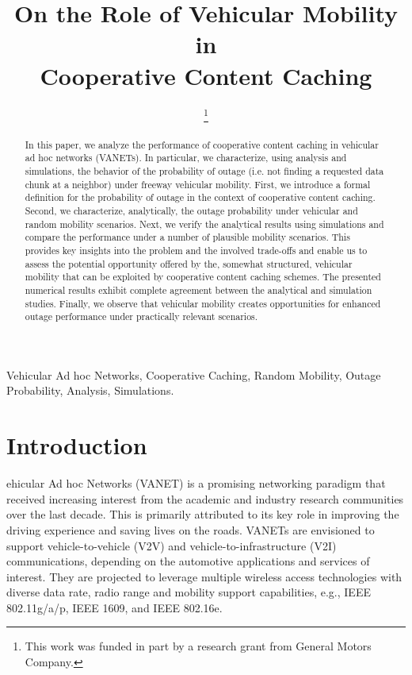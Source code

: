\documentclass[conference,a4paper]{IEEEtran}
\begin{document}
\title{On the Role of Vehicular Mobility in \\ Cooperative Content Caching}

\author{
\thanks{This work was funded in part by a research grant from General Motors Company.}
}

\maketitle

\begin{abstract}
\boldmath
In this paper, we analyze the performance of cooperative content caching in vehicular ad hoc networks (VANETs). In particular, we characterize, using analysis and simulations, the behavior of the probability of outage (i.e. not finding a requested data chunk at a neighbor) under freeway vehicular mobility. First, we introduce a formal definition for the probability of outage in the context of cooperative content caching. Second, we characterize, analytically, the outage probability under vehicular and random mobility scenarios. Next, we verify the analytical results using simulations and compare the performance under a number of plausible mobility scenarios. This provides key insights into the problem and the involved trade-offs and enable us to assess the potential opportunity offered by the, somewhat structured, vehicular mobility that can be exploited by cooperative content caching schemes. The presented numerical results exhibit complete agreement between the analytical and simulation studies. Finally, we observe that vehicular mobility creates opportunities for enhanced outage performance under practically relevant scenarios.\\
\end{abstract}

\begin{IEEEkeywords}
Vehicular Ad hoc Networks, Cooperative Caching, Random Mobility, Outage Probability, Analysis, Simulations.
\end{IEEEkeywords}

\IEEEpeerreviewmaketitle

\section{Introduction}
\small{e}hicular Ad hoc Networks (VANET) is a promising networking paradigm that received increasing interest from the academic and industry research communities over the last decade. This is primarily attributed to its key role in improving the driving experience and saving lives on the roads. VANETs are envisioned to support vehicle-to-vehicle (V2V) and vehicle-to-infrastructure (V2I) communications, depending on the automotive applications and services of interest. They are projected to leverage multiple wireless access technologies with diverse data rate, radio range and mobility support capabilities, e.g., IEEE 802.11g/a/p, IEEE 1609, and IEEE 802.16e.
\end{document}
